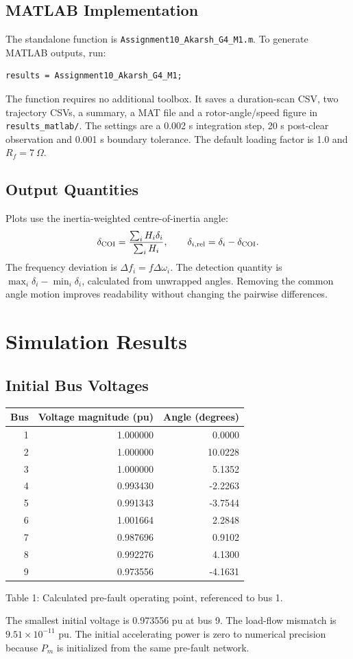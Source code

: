 \documentclass[11pt,a4paper]{article}
\newcommand{\captext}[1]{\begin{center}\small #1\end{center}}
\begin{document}
\subsection{MATLAB Implementation}
The standalone function is \texttt{Assignment10\_Akarsh\_G4\_M1.m}. To generate MATLAB outputs, run:
\begin{verbatim}
results = Assignment10_Akarsh_G4_M1;
\end{verbatim}
The function requires no additional toolbox. It saves a duration-scan CSV, two trajectory CSVs, a summary, a MAT file and a rotor-angle/speed figure in \texttt{results\_matlab/}. The settings are a 0.002 s integration step, 20 s post-clear observation and 0.001 s boundary tolerance. The default loading factor is 1.0 and $R_f=7\ \Omega$.
\subsection{Output Quantities}
Plots use the inertia-weighted centre-of-inertia angle:
\[\delta_{\rm COI}=\frac{\sum_iH_i\delta_i}{\sum_iH_i},\qquad
\delta_{i,\rm rel}=\delta_i-\delta_{\rm COI}.\]
The frequency deviation is $\Delta f_i=f\Delta\omega_i$. The detection quantity is $\max_i\delta_i-\min_i\delta_i$, calculated from unwrapped angles. Removing the common angle motion improves readability without changing the pairwise differences.
\newpage
\section{Simulation Results}
\subsection{Initial Bus Voltages}
\begin{center}\begin{tabular}{rrr}\toprule Bus&Voltage magnitude (pu)&Angle (degrees)\\\midrule
1 & 1.000000 & 0.0000 \\
2 & 1.000000 & 10.0228 \\
3 & 1.000000 & 5.1352 \\
4 & 0.993430 & -2.2263 \\
5 & 0.991343 & -3.7544 \\
6 & 1.001664 & 2.2848 \\
7 & 0.987696 & 0.9102 \\
8 & 0.992276 & 4.1300 \\
9 & 0.973556 & -4.1631 \\
\bottomrule\end{tabular}\end{center}
\captext{Table 1: Calculated pre-fault operating point, referenced to bus 1.}
The smallest initial voltage is 0.973556 pu at bus 9. The load-flow mismatch is $9.51\times10^{-11}$ pu. The initial accelerating power is zero to numerical precision because $P_m$ is initialized from the same pre-fault network.
\end{document}
